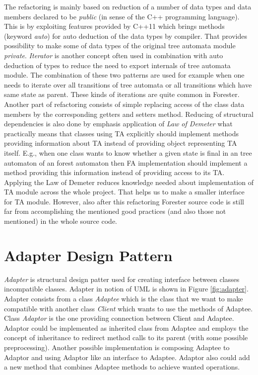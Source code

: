 The refactoring is mainly based on reduction of a number of data types and data members declared
to be \emph{public} (in sense of the C++ programming language).
This is by exploiting features provided by C++11 \cite{stroustrup13} which brings methods (keyword \emph{auto})
for auto deduction of the data types by compiler.
That provides possibility to make some of data types of the original tree automata module \emph{private}.
\emph{Iterator} is another concept often used in combination with auto deduction of types to reduce the need to export internals of tree automata module.
The combination of these two patterns are used for example when one needs to iterate over all transitions of tree automata or all transitions which
have same state as parent.
These kinds of iterations are quite common in Forester.
Another part of refactoring consists of simple replacing access of the class data members by the corresponding getters and setters method.
Reducing of structural dependencies is also done by emphasis application of \emph{Law of Demeter} \cite{lod89} what practically
means that classes using TA explicitly should implement methods providing information about TA instead of providing object representing TA itself.
E.g., when one class wants to know whether a given state is final in an tree automaton of an forest automaton then FA implementation should
implement a method providing this information instead of providing access to its TA.
Applying the Law of Demeter reduces knowledge needed about implementation of TA module across the whole project.
That helps us to make a smaller interface for TA module.
However, also after this refactoring Forester source code is still far from accomplishing the mentioned good practices (and also those not mentioned)
in the whole source code.

\section{Adapter Design Pattern}
\label{sec:adapter}

\emph{Adapter} is structural design patter \cite{gamma95} used for creating interface between classes incompatible classes.
Adapter in notion of UML is shown in Figure \ref{fig:adapter}.
Adapter consists from a class \emph{Adaptee} which is the class that we want to make compatible with
another class \emph{Client} which wants to use the methods of Adaptee.
Class \emph{Adaptor} is the one providing connection between Client and Adaptee.
Adaptor could be implemented as inherited class from Adaptee and employs the concept of inheritance to redirect
method calls to its parent (with some possible preprocessing).
Another possible implementation is composing Adaptee to Adaptor and using Adaptor like an interface to Adaptee.
Adaptor also could add a new method that combines Adaptee methods to achieve wanted operations.

